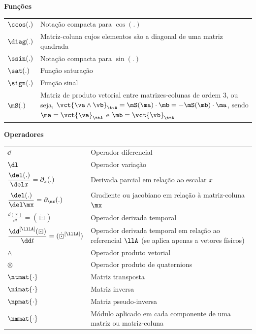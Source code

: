 \documentclass[]{politex}
\begin{document}
\begin{center} \begin{Large} \textbf{Funções} \end{Large} \end{center}
\begin{longtable}{lp{}}
  $\ccos(.)$ & Notação compacta para $\cos(.)$ \\
  $\diag(.)$ & Matriz-coluna cujos elementos são a diagonal de uma matriz quadrada \\
  $\ssin(.)$ & Notação compacta para $\sin(.)$ \\
  $\sat(.)$ & Função saturação \\
  $\sign(.)$ & Função sinal \\
  $\mS(.)$ & Matriz de produto vetorial entre matrizes-colunas de ordem 3, ou seja, $\vct{\va \wedge \vb}_{\ttA} = \mS(\ma) \cdot \mb = -\mS(\mb) \cdot \ma $, sendo $\ma = \vct{\va}_{\ttA}$ e $\mb = \vct{\vb}_{\ttA}$ \\
\end{longtable}
\begin{center} \begin{Large} \textbf{Operadores} \end{Large} \end{center}
\begin{longtable}{lp{}}
  $\dd$ & Operador diferencial \\
  $\dl$ & Operador variação \\
  $\displaystyle\frac{\del (.)}{\del x} = \partial_x (.)$ & Derivada parcial em relação ao escalar $x$ \\
  \addlinespace[0.2cm]
  $\displaystyle\frac{\del (.)}{\del \mx} = \partial_\mx (.)$ & Gradiente ou jacobiano em relação à matriz-coluna $\mx$ \\
  \addlinespace[0.2cm]
  $\displaystyle\frac{\dd (\boxdot) }{\dd t} = (\dot{\boxdot})$ & Operador derivada temporal \\
  \addlinespace[0.2cm]
  $\displaystyle\frac{\dd^{[\lllA]}(\boxdot)}{\dd t} = (\dot{\boxdot}^{[\lllA]})$ & Operador derivada temporal em relação ao referencial $\llA$ (se aplica apenas a vetores físicos) \\
  $\wedge$ & Operador produto vetorial \\
  $\otimes$ & Operador produto de quaternions \\
  $\ntmat{\cdot}$ & Matriz transposta \\
  $\nimat{\cdot}$ & Matriz inversa \\
  $\npmat{\cdot}$ & Matriz pseudo-inversa \\
  $\nmmat{\cdot}$ & Módulo aplicado em cada componente de uma matriz ou matriz-coluna
\end{longtable}
\end{document}
